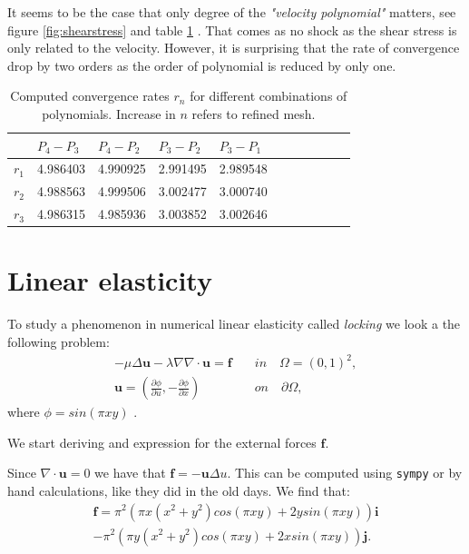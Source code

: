 \documentclass[11pt,a4paper,english]{article}
\numberwithin{equation}{section}
\begin{document}
It seems to be the case that only degree of the \emph{"velocity polynomial"} matters, see figure \ref{fig:shearstress} and table \ref{tab:shear} . That comes as no shock as the shear stress is only related to the velocity. However, it is surprising that the rate of convergence drop by two orders as the order of polynomial is reduced by only one. 


\begin{table}[H]
\centering
\caption{Computed convergence rates $r_n$ for different combinations of polynomials. Increase in $n$ refers to refined mesh. }
\vspace{3mm}
\begin{tabular}{|l|l|l|l|l|l|l|l|l|l|l|}
\hline
 & $P_4-P_3$ & $P_4-P_2$ & $P_3-P_2$ & $P_3-P_1$ \\
\hline
$r_1$ & 4.986403 & 4.990925 & 2.991495 & 2.989548 \\
\hline
$r_2$ & 4.988563 & 4.999506 & 3.002477 & 3.000740 \\
\hline
$r_3$ & 4.986315 & 4.985936 & 3.003852 & 3.002646 \\
\hline
\end{tabular}
\label{tab:shear}
\end{table}

\newpage


\section{Linear elasticity}

To study a phenomenon in numerical linear elasticity called \emph{locking} we look a the following problem:
\begin{align}
-\mu \Delta \mathbf{u} - \lambda \nabla \nabla \cdot \mathbf{u} = \mathbf{f} \quad &in \quad \Omega=(0,1)^2 , \\
\mathbf{u} = \left( \frac{\partial \phi}{\partial u} , -\frac{\partial \phi}{\partial x} \right) \quad &on \quad \partial \Omega ,
\end{align}
where $\phi = sin(\pi x y)$ .

We start deriving and expression for the external forces $\mathbf{f}$.

Since $\nabla \cdot \mathbf{u} = 0$ we have that $\mathbf{f} = - \mathbf{u} \Delta u$. This can be computed using \texttt{sympy} or by hand calculations, like they did in the old days. We find that:
\begin{align*}
\mathbf{f} =  \pi^2(\pi x (x^2+y^2)cos(\pi xy)+ 2y sin(\pi x y)) \mathbf{i} \\ -\pi^2(\pi y(x^2+y^2)cos(\pi xy)+2x sin(\pi xy))\mathbf{j}.
\end{align*}
\end{document}
